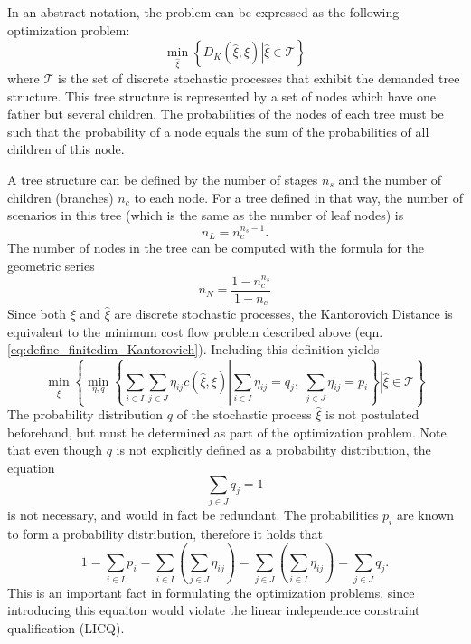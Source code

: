 \documentclass[a4paper, 12pt] {article}
\begin{document}
In an abstract notation, the problem can be expressed as the following optimization problem:
\begin{equation}
  \label{eq:symbolic-optimization-problem}
  \min_{\hat{\xi}}\left\{D_K(\hat{\xi}, \xi)\left|\hat{\xi} \in \mathcal{T}\right.\right\}
\end{equation}
where $\mathcal{T}$ is the set of discrete stochastic processes that exhibit the demanded tree structure. This tree structure is represented by a set of nodes which have one father but several children. The probabilities of the nodes of each tree must be such that the probability of a node equals the sum of the probabilities of all children of this node. 

A tree structure can be defined by the number of stages $n_s$ and the number of children (branches) $n_c$ to each node. For a tree defined in that way, the number of scenarios in this tree (which is the same as the number of leaf nodes) is
\begin{equation}
  \label{eq:number-of-leaf-nodes}
  n_L = n_c^{n_s-1}.
\end{equation}
The number of nodes in the tree can be computed with the formula for the geometric series
\begin{equation}
  \label{eq:number-of-nodes}
  n_N = \frac{1-n_c^{n_s}}{1-n_c}
\end{equation}
Since both $\xi$ and $\hat{\xi}$ are discrete stochastic processes, the Kantorovich Distance is equivalent to the minimum cost flow problem described above (eqn. \ref{eq:define_finitedim_Kantorovich}). Including this definition yields
\begin{equation}
  \label{eq:symbolic-optimization-with-minflow}
  \min_{\hat{\xi}}\left\{\min_{\eta,q}\left\{\sum_{i\in I}\sum_{j\in J}\eta_{ij}c(\hat{\xi}, \xi)\left|\sum_{i\in I}\eta_{ij}=q_j,\;\sum_{j\in J}\eta_{ij}=p_i\right.\right\}\left|\hat{\xi} \in \mathcal{T}\right.\right\}
\end{equation}
The probability distribution $q$ of the stochastic process $\hat{\xi}$ is not postulated beforehand, but must be determined as part of the optimization problem. Note that even though $q$ is not explicitly defined as a probability distribution, the equation
\begin{equation}
  \label{eq:q-schliessbedingung}
  \sum_{j\in J} q_j = 1
\end{equation}
is not necessary, and would in fact be redundant. The probabilities $p_i$ are known to form a probability distribution, therefore it holds that
\begin{equation}
  \label{eq:proof-sum-q-redundant}
  1 = \sum_{i\in I}p_i = \sum_{i\in I}\left(\sum_{j\in J}\eta_{ij}\right)=\sum_{j\in J}\left(\sum_{i\in I}\eta_{ij}\right)=\sum_{j\in J} q_j.
\end{equation}
This is an important fact in formulating the optimization problems, since introducing this equaiton would violate the linear independence constraint qualification (LICQ).
\end{document}
